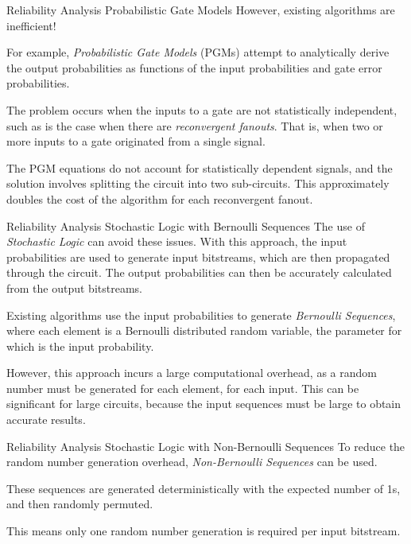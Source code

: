 \documentclass[12pt]{beamer}
\begin{document}
\begin{frame}{Reliability Analysis \small Probabilistic Gate Models}
However, existing algorithms are inefficient!
\vspace{0.25cm}

For example, \emph{Probabilistic Gate Models} (PGMs) attempt to analytically derive the output probabilities as functions of the input probabilities and gate error probabilities. 
\vspace{0.25cm}

The problem occurs when the inputs to a gate are not statistically independent, such as is the case when there are \emph{reconvergent fanouts}. That is, when two or more inputs to a gate originated from a single signal.
\vspace{0.25cm}

The PGM equations do not account for statistically dependent signals, and the solution involves splitting the circuit into two sub-circuits. This approximately doubles the cost of the algorithm for each reconvergent fanout.
\end{frame}

\begin{frame}{Reliability Analysis \small Stochastic Logic with Bernoulli Sequences}
The use of \emph{Stochastic Logic} can avoid these issues. With this approach, the input probabilities are used to generate input bitstreams, which are then propagated through the circuit. The output probabilities can then be accurately calculated from the output bitstreams.
\vspace{0.25cm}

Existing algorithms use the input probabilities to generate \emph{Bernoulli Sequences}, where each element is a Bernoulli distributed random variable, the parameter for which is the input probability.
\vspace{0.25cm}

However, this approach incurs a large computational overhead, as a random number must be generated for each element, for each input. This can be significant for large circuits, because the input sequences must be large to obtain accurate results.
\end{frame}

\begin{frame}{Reliability Analysis \small Stochastic Logic with Non-Bernoulli Sequences}
To reduce the random number generation overhead, \emph{Non-Bernoulli Sequences} can be used.
\vspace{0.25cm}

These sequences are generated deterministically with the expected number of 1s, and then randomly permuted.
\vspace{0.25cm}

This means only one random number generation is required per input bitstream.
\end{frame}
\end{document}
